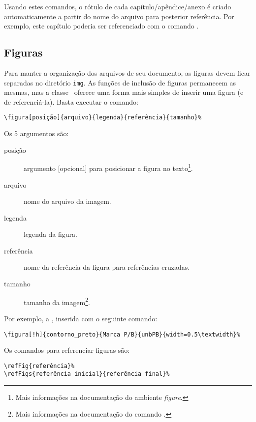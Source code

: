 Usando estes comandos, o rótulo de cada capítulo/apêndice/anexo é criado 
automaticamente a partir do nome do arquivo para posterior referência. Por exemplo,
este capítulo poderia ser referenciado com o comando .

\subsection{Figuras}
Para manter a organização dos arquivos de seu documento, as figuras devem ficar 
separadas no diretório \texttt{img}. As funções de inclusão de figuras permanecem 
as mesmas, mas a classe \unbcic\ oferece uma forma mais simples de inserir uma 
figura (e de referenciá-la). Basta executar o comando:

\begin{verbatim}
\figura[posição]{arquivo}{legenda}{referência}{tamanho}%
\end{verbatim}

Os 5 argumentos são:
\begin{description}
\item[posição] argumento [opcional] para posicionar a figura no texto\footnote{Mais 
informações na documentação do ambiente \emph{figure}.}.
\item[arquivo] nome do arquivo da imagem.
\item[legenda] legenda da figura.
\item[referência] nome da referência da figura para referências cruzadas.
\item[tamanho] tamanho da imagem\footnote{Mais informações na documentação do comando 
.}.
\end{description}

Por exemplo, a , inserida com o seguinte comando:

\begin{verbatim}
\figura[!h]{contorno_preto}{Marca P/B}{unbPB}{width=0.5\textwidth}%
\end{verbatim}

%

Os comandos para referenciar figuras são:

\begin{verbatim}
\refFig{referência}%
\refFigs{referência inicial}{referência final}%
\end{verbatim}

